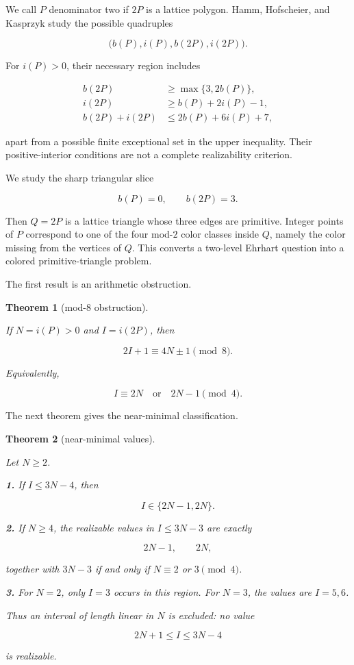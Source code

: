 \documentclass[11pt]{article}
\newtheorem{theorem}{Theorem}[section]
\theoremstyle{remark}
\numberwithin{equation}{section}
\begin{document}
We call $P$ denominator two if $2P$ is a lattice polygon. Hamm, Hofscheier, and Kasprzyk \cite{ref2} study the possible quadruples

\[
\bigl(b(P),i(P),b(2P),i(2P)\bigr).
\]

For $i(P)>0$, their necessary region includes

\[
\begin{aligned}
b(2P)&\geq\max\{3,2b(P)\},\\
i(2P)&\geq b(P)+2i(P)-1,\\
b(2P)+i(2P)&\leq2b(P)+6i(P)+7,
\end{aligned}
\]

apart from a possible finite exceptional set in the upper inequality. Their positive-interior conditions are not a complete realizability criterion.

We study the sharp triangular slice

\[
b(P)=0,\qquad b(2P)=3.
\]

Then $Q=2P$ is a lattice triangle whose three edges are primitive. Integer points of $P$ correspond to one of the four mod-$2$ color classes inside $Q$, namely the color missing from the vertices of $Q$. This converts a two-level Ehrhart question into a colored primitive-triangle problem.

The first result is an arithmetic obstruction.

\begin{theorem}[mod-$8$ obstruction]\label{thm:mod8}

If $N=i(P)>0$ and $I=i(2P)$, then

\[
2I+1\equiv4N\pm1\pmod8.
\]

Equivalently,

\[
I\equiv2N\quad\text{or}\quad2N-1\pmod4.
\]

\end{theorem}

The next theorem gives the near-minimal classification.

\begin{theorem}[near-minimal values]\label{thm:near-minimal}

Let $N\ge2$.

\par\noindent\textbf{1.} If $I\le3N-4$, then

\[
I\in\{2N-1,2N\}.
\]

\par\noindent\textbf{2.} If $N\ge4$, the realizable values in $I\le3N-3$ are exactly

\[
2N-1,\qquad2N,
\]

together with $3N-3$ if and only if $N\equiv2$ or $3\pmod4$.

\par\noindent\textbf{3.} For $N=2$, only $I=3$ occurs in this region. For $N=3$, the values are $I=5,6$.

Thus an interval of length linear in $N$ is excluded: no value

\[
2N+1\leq I\leq3N-4
\]

is realizable.

\end{theorem}
\end{document}
